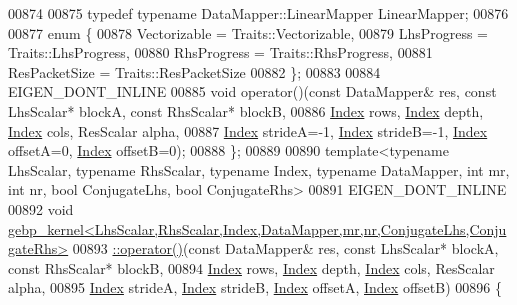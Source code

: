 \begin{DoxyCode}
00874 
00875   \textcolor{keyword}{typedef} \textcolor{keyword}{typename} DataMapper::LinearMapper LinearMapper;
00876 
00877   \textcolor{keyword}{enum} \{
00878     Vectorizable  = Traits::Vectorizable,
00879     LhsProgress   = Traits::LhsProgress,
00880     RhsProgress   = Traits::RhsProgress,
00881     ResPacketSize = Traits::ResPacketSize
00882   \};
00883 
00884   EIGEN\_DONT\_INLINE
00885   \textcolor{keywordtype}{void} operator()(\textcolor{keyword}{const} DataMapper& res, \textcolor{keyword}{const} LhsScalar* blockA, \textcolor{keyword}{const} RhsScalar* blockB,
00886                   \hyperlink{namespace_eigen_a62e77e0933482dafde8fe197d9a2cfde}{Index} rows, \hyperlink{namespace_eigen_a62e77e0933482dafde8fe197d9a2cfde}{Index} depth, \hyperlink{namespace_eigen_a62e77e0933482dafde8fe197d9a2cfde}{Index} cols, ResScalar alpha,
00887                   \hyperlink{namespace_eigen_a62e77e0933482dafde8fe197d9a2cfde}{Index} strideA=-1, \hyperlink{namespace_eigen_a62e77e0933482dafde8fe197d9a2cfde}{Index} strideB=-1, \hyperlink{namespace_eigen_a62e77e0933482dafde8fe197d9a2cfde}{Index} offsetA=0, 
      \hyperlink{namespace_eigen_a62e77e0933482dafde8fe197d9a2cfde}{Index} offsetB=0);
00888 \};
00889 
00890 \textcolor{keyword}{template}<\textcolor{keyword}{typename} LhsScalar, \textcolor{keyword}{typename} RhsScalar, \textcolor{keyword}{typename} Index, \textcolor{keyword}{typename} DataMapper, \textcolor{keywordtype}{int} mr, \textcolor{keywordtype}{int} nr, \textcolor{keywordtype}{bool} 
      ConjugateLhs, \textcolor{keywordtype}{bool} ConjugateRhs>
00891 EIGEN\_DONT\_INLINE
00892 \textcolor{keywordtype}{void} 
      \hyperlink{struct_eigen_1_1internal_1_1gebp__kernel}{gebp\_kernel<LhsScalar,RhsScalar,Index,DataMapper,mr,nr,ConjugateLhs,ConjugateRhs>}
00893 \hyperlink{struct_eigen_1_1internal_1_1gebp__kernel}{  ::operator()}(\textcolor{keyword}{const} DataMapper& res, \textcolor{keyword}{const} LhsScalar* blockA, \textcolor{keyword}{const} RhsScalar* blockB,
00894                \hyperlink{namespace_eigen_a62e77e0933482dafde8fe197d9a2cfde}{Index} rows, \hyperlink{namespace_eigen_a62e77e0933482dafde8fe197d9a2cfde}{Index} depth, \hyperlink{namespace_eigen_a62e77e0933482dafde8fe197d9a2cfde}{Index} cols, ResScalar alpha,
00895                \hyperlink{namespace_eigen_a62e77e0933482dafde8fe197d9a2cfde}{Index} strideA, \hyperlink{namespace_eigen_a62e77e0933482dafde8fe197d9a2cfde}{Index} strideB, \hyperlink{namespace_eigen_a62e77e0933482dafde8fe197d9a2cfde}{Index} offsetA, \hyperlink{namespace_eigen_a62e77e0933482dafde8fe197d9a2cfde}{Index} offsetB)
00896   \{

\end{DoxyCode}

